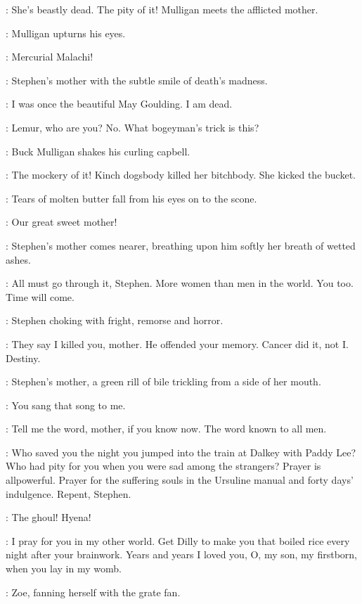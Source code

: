 \BuckMulligan:
She's beastly dead.
The pity of it!
Mulligan meets the afflicted mother.

:
Mulligan upturns his eyes.

\BuckMulligan:
Mercurial Malachi!

:
Stephen's mother with the subtle smile of death's madness.

\Mother:
I was once the beautiful May Goulding.
I am dead.

\Stephen:
Lemur, who are you?
No. What bogeyman's trick is this?

:
Buck Mulligan shakes his curling capbell.

\BuckMulligan:
The mockery of it!
Kinch dogsbody killed her bitchbody.
She kicked the bucket.

:
Tears of molten butter fall from his eyes on to the scone.

\BuckMulligan:
Our great sweet mother!

:
Stephen's mother comes nearer, breathing upon him softly her breath of wetted ashes.

\Mother:
All must go through it, Stephen.
More women than men in the world.
You too.
Time will come.

:
Stephen choking with fright, remorse and horror.

\Stephen:
They say I killed you, mother.
He offended your memory.
Cancer did it, not I.
Destiny.

:
Stephen's mother, a green rill of bile trickling from a side of her mouth.

\Mother:
You sang that song to me.

\Stephen:
Tell me the word, mother, if you know now.
The word known to all men.

\Mother:
Who saved you the night you jumped into the train at Dalkey with Paddy Lee?
Who had pity for you when you were sad among the strangers?
Prayer is allpowerful.
Prayer for the suffering souls in the Ursuline manual and forty days' indulgence.
Repent, Stephen.

\Stephen:
The ghoul!
Hyena!

\Mother:
I pray for you in my other world.
Get Dilly to make you that boiled rice every night after your brainwork.
Years and years I loved you, O, my son, my firstborn, when you lay in my womb.

:
Zoe, fanning herself with the grate fan.

